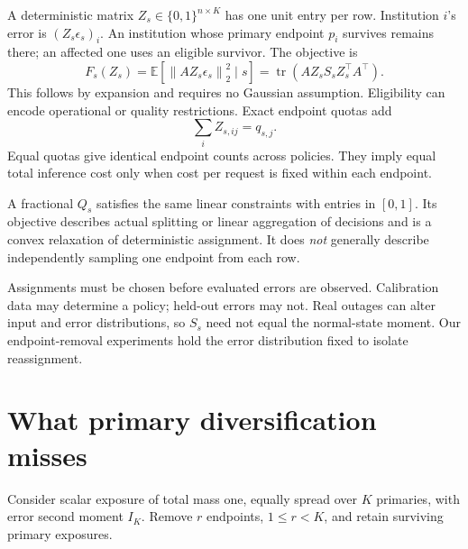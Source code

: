 \documentclass[11pt]{article}
\newcommand{\E}{\mathbb{E}}
\newcommand{\tr}{\operatorname{tr}}
\newcommand{\norm}[1]{\left\lVert#1\right\rVert}
\begin{document}
A deterministic matrix \(Z_s\in\{0,1\}^{n\times K}\) has one unit entry per row. Institution \(i\)'s error is \((Z_s\epsilon_s)_i\). An institution whose primary endpoint \(p_i\) survives remains there; an affected one uses an eligible survivor. The objective is
\begin{equation}
 F_s(Z_s)=\E[\norm{AZ_s\epsilon_s}_2^2\mid s]
       =\tr(AZ_sS_sZ_s^\top A^\top).
 \label{eq:F}
\end{equation}
This follows by expansion and requires no Gaussian assumption. Eligibility can encode operational or quality restrictions. Exact endpoint quotas add
\begin{equation}
 \sum_i Z_{s,ij}=q_{s,j}.
 \label{eq:quota}
\end{equation}
Equal quotas give identical endpoint counts across policies. They imply equal total inference cost only when cost per request is fixed within each endpoint.

A fractional \(Q_s\) satisfies the same linear constraints with entries in \([0,1]\). Its objective describes actual splitting or linear aggregation of decisions and is a convex relaxation of deterministic assignment. It does \emph{not} generally describe independently sampling one endpoint from each row.

Assignments must be chosen before evaluated errors are observed. Calibration data may determine a policy; held-out errors may not. Real outages can alter input and error distributions, so \(S_s\) need not equal the normal-state moment. Our endpoint-removal experiments hold the error distribution fixed to isolate reassignment.

\section{What primary diversification misses}
Consider scalar exposure of total mass one, equally spread over \(K\) primaries, with error second moment \(I_K\). Remove \(r\) endpoints, \(1\le r<K\), and retain surviving primary exposures.
\end{document}

